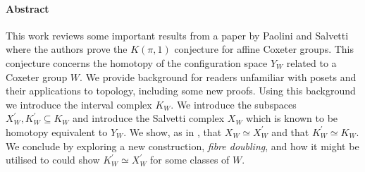 \documentclass[class=guthesis, crop=false]{standalone}
\begin{document}
\paragraph{Abstract}
This work reviews some important results from a paper by Paolini and Salvetti \cite{paolini_salvetti_kpi1_2021} where the authors prove the $K(\pi,1)$ conjecture for affine Coxeter groups. This conjecture concerns the homotopy of the configuration space $Y_W$ related to a Coxeter group $W$. We provide background for readers unfamiliar with posets and their applications to topology, including some new proofs. Using this background we introduce the interval complex $K_W$. We introduce the subspaces $X^\prime_W, K^\prime_W \subseteq K_W$ and introduce the Salvetti complex $X_W$ which is known to be homotopy equivalent to $Y_W$. We show, as in \cite{paolini_salvetti_kpi1_2021}, that $X_W \simeq X^\prime_W$ and that $K^\prime_W \simeq K_W$. We conclude by exploring a new construction, \emph{fibre doubling}, and how it might be utilised to could show $K^\prime_W\simeq X^\prime_W$ for some classes of $W$. 
\end{document}
